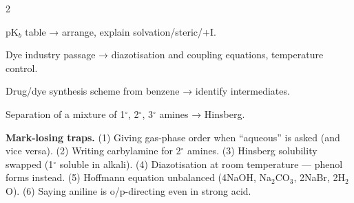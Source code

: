 \documentclass[10pt,a4paper]{extarticle}
\begin{document}
\begin{multicols}{2}
\begin{fl}
\item pK$_b$ table → arrange, explain solvation/steric/+I.
\item Dye industry passage → diazotisation and coupling equations, temperature control.
\item Drug/dye synthesis scheme from benzene → identify intermediates.
\item Separation of a mixture of 1$^\circ$, 2$^\circ$, 3$^\circ$ amines → Hinsberg.
\end{fl}

\begin{tip}\Tip \textbf{Mark-losing traps.} (1) Giving gas-phase order when ``aqueous'' is asked (and vice versa). (2) Writing carbylamine for 2$^\circ$ amines. (3) Hinsberg solubility swapped (1$^\circ$ soluble in alkali). (4) Diazotisation at room temperature — phenol forms instead. (5) Hoffmann equation unbalanced (4NaOH, Na$_2$CO$_3$, 2NaBr, 2H$_2$O). (6) Saying aniline is o/p-directing even in strong acid.\end{tip}
\end{multicols}
\begin{tcolorbox}[enhanced,colback=white,colframe=uc,boxrule=0.6pt,arc=2pt,title={\sffamily\bfseries\footnotesize My notes — Ch 9},colbacktitle=uc,coltitle=white,height fill,before skip=4pt]
\end{tcolorbox}
\end{document}
